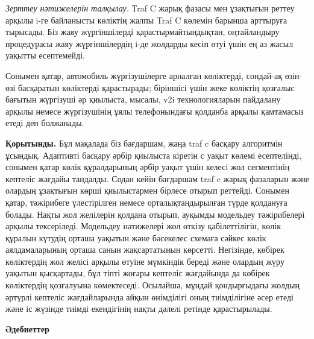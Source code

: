 \emph{Зерттеу нәтижелерін талқылау.} Тraf C жарық фазасы мен ұзақтығын
реттеу арқылы i-ге байланысты көліктің жалпы Traf C көлемін барынша
арттыруға тырысады. Біз жаяу жүргіншілерді қарастырмайтындықтан,
оңтайландыру процедурасы жаяу жүргіншілердің i-де жолдарды кесіп өтуі
үшін ең аз жасыл уақытты есептемейді.

Сонымен қатар, автомобиль жүргізушілерге арналған көліктерді, сондай-ақ
өзін-өзі басқаратын көліктерді қарастырады; біріншісі үшін жеке көліктің
қозғалыс бағытын жүргізуші әр қиылыста, мысалы, v2i технологияларын
пайдалану арқылы немесе жүргізушінің ұялы телефонындағы қолданба арқылы
қамтамасыз етеді деп болжанады.

{\bfseries Қорытынды.} Бұл мақалада біз бағдаршам, жаңа traf c басқару
алгоритмін ұсындық. Адаптивті басқару әрбір қиылыста кіретін с уақыт
көлемі есептелінді, сонымен қатар көлік құралдарының әрбір уақыт үшін
келесі жол сегментінің кептеліс жағдайы тандалды. Содан кейін бағдаршам
traf c жарық фазаларын және олардың ұзақтығын көрші қиылыстармен бірлесе
отырып реттейді. Сонымен қатар, тәжірибеге үлестірілген немесе
орталықтандырылған түрде қолдануға болады. Нақты жол желілерін қолдана
отырып, ауқымды модельдеу тәжірибелері арқылы тексеріледі. Модельдеу
нәтижелері жол өткізу қабілеттілігін, көлік құралын күтудің орташа
уақытын және бәсекелес схемаға сәйкес көлік аялдамаларының орташа санын
жақсартатынын көрсетті. Негізінде, көбірек көліктердің жол желісі арқылы
өтуіне мүмкіндік береді және олардың жүру уақытын қысқартады, бұл тіпті
жоғары кептеліс жағдайында да көбірек көліктердің қозғалуына
көмектеседі. Осылайша, мұндай қондырғыдағы жолдың әртүрлі кептеліс
жағдайларында айқын өнімділігі оның тиімділігіне әсер етеді және іс
жүзінде тиімді екендігінің нақты дәлелі ретінде қарастырылады.

\begin{center}
  {\bfseries Әдебиеттер}
  \end{center}


